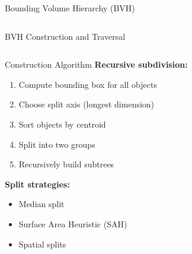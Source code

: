 \begin{frame}{Bounding Volume Hierarchy (BVH)}
\begin{columns}
\begin{column}{0.5\textwidth}
        \end{column}
    \end{columns}
\end{frame}

\begin{frame}{BVH Construction and Traversal}
    \begin{columns}
        \begin{column}{0.5\textwidth}
            \begin{mathbox}{Construction Algorithm}
                \textbf{Recursive subdivision:}
                \begin{enumerate}
                    \item Compute bounding box for all objects
                    \item Choose split axis (longest dimension)
                    \item Sort objects by centroid
                    \item Split into two groups
                    \item Recursively build subtrees
                \end{enumerate}
                
                \vspace{0.3cm}
                \textbf{Split strategies:}
                \begin{itemize}
                    \item Median split
                    \item Surface Area Heuristic (SAH)
                    \item Spatial splits
                \end{itemize}
            \end{mathbox}
        \end{column}
        \begin{column}{0.5\textwidth}
\end{column}
\end{columns}
\end{frame}
